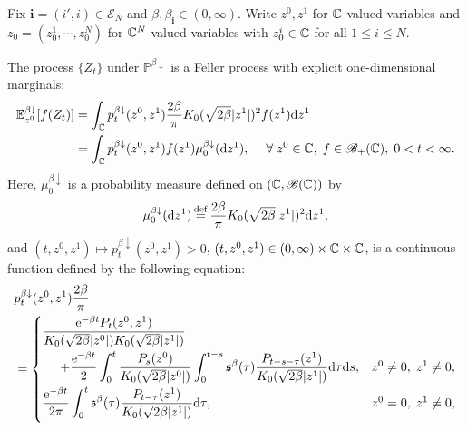 \documentclass[12pt, twoside]{article}
\numberwithin{figure}{section}
\newcommand{\e}{{\mathrm e}}
\newcommand{\1}{\mathds 1}
\newcommand{\B}{\mathscr B}
\newcommand{\da}{{\downarrow}}
\renewcommand{\P}{{\mathbb P}}
\newcommand{\E}{{\mathbb E}}
\newcommand{\mc}{\mathcal}
\renewcommand{\d}{{\mathrm d}}
\newcommand{\2}{{\mathbf 1}}
\newcommand{\s}{{\mathfrak s}}
\newcommand{\defeq}{{\stackrel{\rm def}{=}}}
\newcommand{\cc}{{^\circ}}
\newcommand{\bi}{\mathbf i}
\newcommand{\CN}{{\mathbb C}^{\it N}}
\begin{document}
\begin{thm}\label{thm:formulas}
Fix $\bi=(i\prime,i)\in \mc E_N$ and $\beta,\beta_\bi\in (0,\infty)$. Write $z^0,z^1$ for $ \Bbb C$-valued variables and $z_0=(z_0^1,\cdots,z_0^N)$ for $\CN$-valued variables with $z^i_0\in \Bbb C$ for all $1\leq i\leq N$.\smallskip 

\noindent {\rm (1$\cc$)} The process $\{Z_t\}$ under $\P^{\beta\da}$ is a Feller process with explicit one-dimensional marginals: 
\begin{align}\label{eq:Feller}
\begin{aligned}
\E^{\beta\da}_{z^0}[f(Z_t)]
&=\int_{\Bbb C}
p^{\beta\da}_t(z^0,z^1)\frac{2\beta}{\pi} K_0(\sqrt{2\beta}|z^1|)^2f(z^1)\d z^1\\
&=\int_{\Bbb C}p^{\beta\da}_t(z^0,z^1)f(z^1)\mu_0^{\beta\da}(\d z^1),\quad \; \forall\;z^0\in \Bbb C,\; f\in \B_+(\Bbb C),\;0<t<\infty.
\end{aligned}
\end{align}
Here, $\mu_0^{\beta\da}$ is a probability measure defined on $(\Bbb C,\B(\Bbb C))$ by
\begin{align}\label{def:mbeta}
\mu_0^{\beta\da}(\d z^1)\,\defeq\, \frac{2\beta}{\pi}K_0(\sqrt{2\beta}|z^1|)^2\d z^1,
\end{align}
and $(t,z^0,z^1)\mapsto p^{\beta\da }_{t}(z^0,z^1)>0$, $(t,z^0,z^1)\in (0,\infty)\times\Bbb C\times \Bbb C$, is a continuous function defined by the following equation:
 \begin{align}
&
p^{\beta\da}_t(z^0,z^1)\frac{2\beta}{\pi} \notag\\
&=
\begin{cases}\label{def:pbetat}
\displaystyle \frac{\e^{-\beta t}P_{t}(z^0,z^1)}{K_0(\sqrt{2\beta}|z^0|)K_0(\sqrt{2\beta}|z^1|)}\\
\vspace{-.4cm}\\
\displaystyle \hspace{.5cm}+\frac{\e^{-\beta t}}{2} \int_0^t \frac{P_{s}( z^0)}{K_0(\sqrt{2\beta}|z^0|)}\int_0^{t-s}\s^\beta(\tau)  \frac{P_{t-s-\tau}(z^1)}{K_0(\sqrt{2\beta }|z^1|)}
\d \tau\d s, &z^0\neq 0,\; z^1\neq 0,\\
\vspace{-.4cm}\\
\displaystyle \frac{\e^{-\beta t}}{2\pi}\int_0^t \s^\beta(\tau) \frac{P_{t-\tau}(z^1)}{K_0(\sqrt{2\beta }|z^1|)}\d \tau,&z^0=0,\; z^1\neq 0,
\\
\vspace{-.4cm}\\

\end{cases}
\end{align}
\end{thm}
\end{document}
